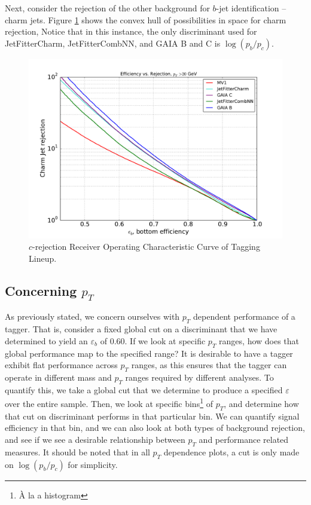 Next, consider the rejection of the other background for $b$-jet identification -- charm jets. Figure \ref{fig:crejROC} shows the convex hull of possibilities in \er space for charm rejection, Notice that in this instance, the only discriminant used for JetFitterCharm, JetFitterCombNN, and GAIA B and C is $\log(p_b/p_c)$.

\begin{figure}[h]
\includegraphics[width=\textwidth]{figures/btag/c_rej_ROC.pdf}
\caption[The ATLAS detector]{$c$-rejection Receiver Operating Characteristic Curve of Tagging Lineup.
\label{fig:crejROC}}
\end{figure}

\newcommand{\pt}{$p_T$ }
\subsection{Concerning \pt}


As previously stated, we concern ourselves with $p_T$ dependent performance of a tagger. That is, consider a fixed global cut on a discriminant that we have determined to yield an $\varepsilon_b$ of 0.60. If we look at specific $p_T$ ranges, how does that global performance map to the specified range? It is desirable to have a tagger exhibit flat performance across $p_T$ ranges, as this ensures that the tagger can operate in different mass and $p_T$ ranges required by different analyses. To quantify this, we take a global cut that we determine to produce a specified $\varepsilon$ over the entire sample. Then, we look at specific bins\footnote{\`{A} la a histogram} of $p_T$, and determine how that cut on discriminant performs in that particular bin. We can quantify signal efficiency in that bin, and we can also look at both types of background rejection, and see if we see a desirable relationship between $p_T$ and performance related measures. It should be noted that in all \pt dependence plots, a cut is only made on $\log(p_b/p_c)$ for simplicity.


